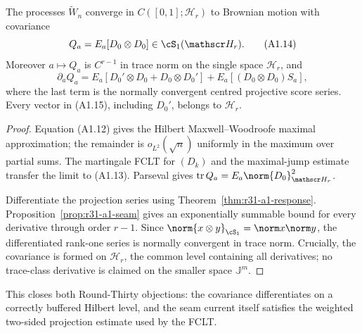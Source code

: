 \begin{theorem}
\label{thm:r31-a1-fclt}
The processes $\widetilde W_n$ converge in
$C([0,1];\mathscr H_r)$ to Brownian motion with covariance
\[
 Q_a=E_a[D_0\otimes D_0]\in\cS_1(\mathscr H_r).           \tag{A1.14}
\]
Moreover $a\mapsto Q_a$ is $C^{r-1}$ in trace norm on the single space
$\mathscr H_r$, and
\[
 \partial_aQ_a
 =E_a[D_0'\otimes D_0+D_0\otimes D_0']
  +E_a[(D_0\otimes D_0)S_a],                              \tag{A1.15}
\]
where the last term is the normally convergent centred projective score
series.  Every vector in (A1.15), including $D_0'$, belongs to
$\mathscr H_r$.
\end{theorem}

\begin{proof}
Equation (A1.12) gives the Hilbert Maxwell--Woodroofe maximal approximation;
the remainder is $o_{L^2}(\sqrt n)$ uniformly in the maximum over partial
sums.  The martingale FCLT for $(D_k)$ and the maximal-jump estimate transfer
the limit to (A1.13).  Parseval gives
$\operatorname{tr}Q_a=E_a\norm{D_0}_{\mathscr H_r}^2$.

Differentiate the projection series using
Theorem~\ref{thm:r31-a1-response}.  Proposition~\ref{prop:r31-a1-seam}
gives an exponentially summable bound for every derivative through order
$r-1$.  Since
$\norm{x\otimes y}_{\cS_1}=\norm x\norm y$, the differentiated rank-one
series is normally convergent in trace norm.  Crucially, the covariance is
formed on $\mathscr H_r$, the common level containing all derivatives; no
trace-class derivative is claimed on the smaller space $\mathbb J^m$.
\end{proof}

This closes both Round-Thirty objections: the covariance differentiates on a
correctly buffered Hilbert level, and the seam current itself satisfies the
weighted two-sided projection estimate used by the FCLT.
